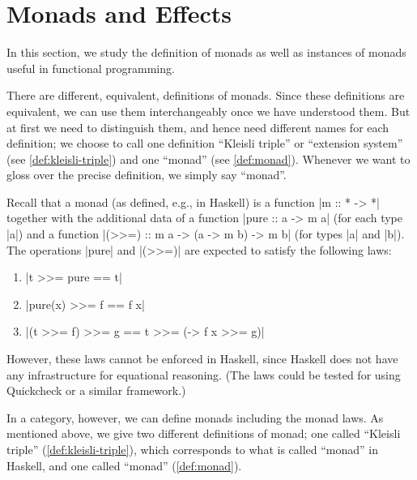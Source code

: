 
\section{Monads and Effects}
\label{sec:monads}

In this section, we study the definition of monads as well as instances of monads useful in functional programming.

There are different, equivalent, definitions of monads.
Since these definitions are equivalent, we can use them interchangeably once we have understood them.
But at first we need to distinguish them, and hence need different names for each definition; we choose to call one definition ``Kleisli triple'' or ``extension system'' (see \cref{def:kleisli-triple}) and one ``monad'' (see \cref{def:monad}).
Whenever we want to gloss over the precise definition, we simply say ``monad''.


Recall that a monad (as defined, e.g., in Haskell) is a function |m :: * -> *| together with the additional data of a function |pure :: a -> m a| (for each type |a|) and a function |(>>=) :: m a -> (a -> m b) -> m b| (for types |a| and |b|).
The operations |pure| and |(>>=)| are expected to satisfy the following laws:
\begin{enumerate}
\item |t >>= pure == t| %
\item |pure(x) >>= f == f x| %
\item |(t >>= f) >>= g == t >>= (\x -> f x >>= g)|%
\end{enumerate}
However, these laws cannot be enforced in Haskell, since Haskell does not have any infrastructure for equational reasoning.
(The laws could be tested for using Quickcheck or a similar framework.)

In a category, however, we can define monads including the monad laws.
As mentioned above, we give two different definitions of monad;
one called ``Kleisli triple'' (\cref{def:kleisli-triple}), which corresponds to what is called ``monad'' in Haskell,
and one called ``monad'' (\cref{def:monad}). 


